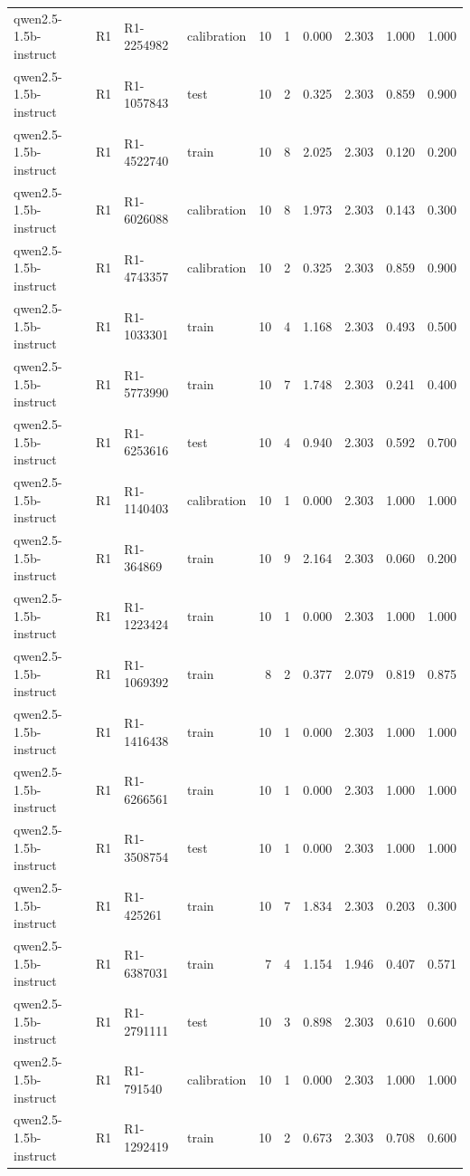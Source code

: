 \begin{table}
\begin{tabular}{llllrrrrrr}
qwen2.5-1.5b-instruct & R1 & R1-2254982 & calibration & 10 & 1 & 0.000 & 2.303 & 1.000 & 1.000 \\
qwen2.5-1.5b-instruct & R1 & R1-1057843 & test & 10 & 2 & 0.325 & 2.303 & 0.859 & 0.900 \\
qwen2.5-1.5b-instruct & R1 & R1-4522740 & train & 10 & 8 & 2.025 & 2.303 & 0.120 & 0.200 \\
qwen2.5-1.5b-instruct & R1 & R1-6026088 & calibration & 10 & 8 & 1.973 & 2.303 & 0.143 & 0.300 \\
qwen2.5-1.5b-instruct & R1 & R1-4743357 & calibration & 10 & 2 & 0.325 & 2.303 & 0.859 & 0.900 \\
qwen2.5-1.5b-instruct & R1 & R1-1033301 & train & 10 & 4 & 1.168 & 2.303 & 0.493 & 0.500 \\
qwen2.5-1.5b-instruct & R1 & R1-5773990 & train & 10 & 7 & 1.748 & 2.303 & 0.241 & 0.400 \\
qwen2.5-1.5b-instruct & R1 & R1-6253616 & test & 10 & 4 & 0.940 & 2.303 & 0.592 & 0.700 \\
qwen2.5-1.5b-instruct & R1 & R1-1140403 & calibration & 10 & 1 & 0.000 & 2.303 & 1.000 & 1.000 \\
qwen2.5-1.5b-instruct & R1 & R1-364869 & train & 10 & 9 & 2.164 & 2.303 & 0.060 & 0.200 \\
qwen2.5-1.5b-instruct & R1 & R1-1223424 & train & 10 & 1 & 0.000 & 2.303 & 1.000 & 1.000 \\
qwen2.5-1.5b-instruct & R1 & R1-1069392 & train & 8 & 2 & 0.377 & 2.079 & 0.819 & 0.875 \\
qwen2.5-1.5b-instruct & R1 & R1-1416438 & train & 10 & 1 & 0.000 & 2.303 & 1.000 & 1.000 \\
qwen2.5-1.5b-instruct & R1 & R1-6266561 & train & 10 & 1 & 0.000 & 2.303 & 1.000 & 1.000 \\
qwen2.5-1.5b-instruct & R1 & R1-3508754 & test & 10 & 1 & 0.000 & 2.303 & 1.000 & 1.000 \\
qwen2.5-1.5b-instruct & R1 & R1-425261 & train & 10 & 7 & 1.834 & 2.303 & 0.203 & 0.300 \\
qwen2.5-1.5b-instruct & R1 & R1-6387031 & train & 7 & 4 & 1.154 & 1.946 & 0.407 & 0.571 \\
qwen2.5-1.5b-instruct & R1 & R1-2791111 & test & 10 & 3 & 0.898 & 2.303 & 0.610 & 0.600 \\
qwen2.5-1.5b-instruct & R1 & R1-791540 & calibration & 10 & 1 & 0.000 & 2.303 & 1.000 & 1.000 \\
qwen2.5-1.5b-instruct & R1 & R1-1292419 & train & 10 & 2 & 0.673 & 2.303 & 0.708 & 0.600 \\

\end{tabular}
\end{table}
